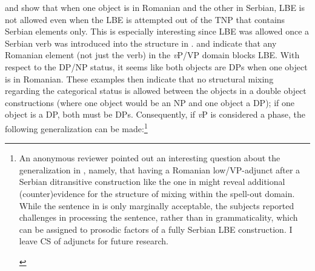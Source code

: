 \documentclass[output=paper,hidelinks,newtxmath,]{langscibook}
\begin{document}
\noindent {} and  show that when one object is in Romanian and the other in Serbian, LBE is not allowed even when the LBE is attempted out of the TNP that contains Serbian elements only. This is especially interesting since LBE was allowed once a Serbian verb was introduced into the structure in .  and  indicate that any Romanian element (not just the verb) in the \textit{v}P/VP domain blocks LBE. With respect to the DP/NP status, it seems like both objects are DPs when one object is in Romanian. These examples then indicate that no structural mixing regarding the categorical status is allowed between the objects in a double object constructions (where one object would be an NP and one object a DP); if one object is a DP, both must be DPs. Consequently, if \textit{v}P is considered a phase, the following generalization can be made:\footnote{\label{15:fn12}An anonymous reviewer pointed out an interesting question about the generalization in , namely, that having a Romanian low/VP-adjunct after a Serbian ditransitive construction like the one in  might reveal additional (counter)evidence for the structure of mixing within the spell-out domain. While the sentence in  is only marginally acceptable, the subjects reported challenges in processing the sentence, rather than in grammaticality, which can be assigned to prosodic factors of a fully Serbian LBE construction. I leave CS of adjuncts for future research.

\ea\label{15:fn12ex}
\z\z

}
\end{document}
